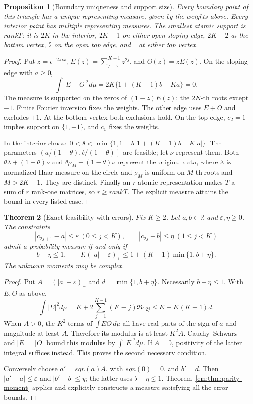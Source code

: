 \documentclass[11pt,a4paper]{article}
\newtheorem{theorem}{Theorem}[section]
\newtheorem{proposition}[theorem]{Proposition}
\theoremstyle{definition}
\theoremstyle{remark}
\theoremstyle{plain}
\numberwithin{equation}{section}
\def\operatorname#1{#1}\def\mathrm#1{#1}}
\begin{document}
\begin{proposition}[Boundary uniqueness and support size]\label{em:moment-boundary}
Every boundary point of this triangle has a unique representing
measure, given by the weights above. Every interior point has
multiple representing measures. The smallest atomic support is
$\operatorname{rank}T$: it is $2K$ in the interior, $2K-1$ on either
open sloping edge, $2K-2$ at the bottom vertex, $2$ on the open top
edge, and $1$ at either top vertex.
\end{proposition}
\begin{proof}
Put $z=e^{-2\pi i x}$,
$E(z)=\sum_{j=0}^{K-1}z^{2j}$, and $O(z)=zE(z)$.
On the sloping edge with $a\ge0$,
\[
\int|E-O|^2d\mu=2K\{1+(K-1)b-Ka\}=0.
\]
The measure is supported on the zeros of $(1-z)E(z)$: the $2K$-th
roots except $-1$. Finite Fourier inversion fixes the weights.
The other edge uses $E+O$ and excludes $+1$. At the bottom vertex
both exclusions hold. On the top edge, $c_2=1$ implies support on
$\{1,-1\}$, and $c_1$ fixes the weights.

In the interior choose
$0<\theta<\min\{1,1-b,1+(K-1)b-K|a|\}$.
The parameters $(a/(1-\theta),b/(1-\theta))$ are feasible; let
$\nu$ represent them. Both
$\theta\lambda+(1-\theta)\nu$ and
$\theta\rho_M+(1-\theta)\nu$ represent the original data, where $\lambda$ is normalized Haar measure on the circle and
$\rho_M$ is uniform on $M$-th roots and $M>2K-1$. They are distinct.
Finally an $r$-atomic representation makes $T$ a sum of $r$ rank-one
matrices, so $r\ge\operatorname{rank}T$. The explicit measure attains
the bound in every listed case.
\end{proof}

\begin{theorem}[Exact feasibility with errors]\label{em:thm:parity-noise}
Fix $K\ge2$. Let $a,b\in\mathbb R$ and $\varepsilon,\eta\ge0$. The constraints
\[
|c_{2j+1}-a|\le\varepsilon\ (0\le j<K),\qquad
|c_{2j}-b|\le\eta\ (1\le j<K)
\]
admit a probability measure if and only if
\begin{equation}\label{em:eq:parity-robust}
b-\eta\le1,\qquad
K(|a|-\varepsilon)_+\le1+(K-1)\min\{1,b+\eta\}.
\end{equation}
The unknown moments may be complex.
\end{theorem}
\begin{proof}
Put $A=(|a|-\varepsilon)_+$ and $d=\min\{1,b+\eta\}$.
Necessarily $b-\eta\le1$. With $E,O$ as above,
\[
\int|E|^2d\mu
=K+2\sum_{j=1}^{K-1}(K-j)\Re c_{2j}
\le K+K(K-1)d.
\]
When $A>0$, the $K^2$ terms of $\int E\overline O\,d\mu$ all
have real parts of the sign of $a$ and magnitude at least $A$.
Therefore its modulus is at least $K^2A$. Cauchy--Schwarz and
$|E|=|O|$ bound this modulus by $\int|E|^2d\mu$.
If $A=0$, positivity of the latter integral suffices instead.
This proves the second necessary condition.

Conversely choose $a'=\operatorname{sgn}(a)A$, with
$\operatorname{sgn}(0)=0$, and $b'=d$.
Then $|a'-a|\le\varepsilon$ and $|b'-b|\le\eta$; the latter uses
$b-\eta\le1$. Theorem~\ref{em:thm:parity-moment} applies and explicitly
constructs a measure satisfying all the error bounds.
\end{proof}
\end{document}
